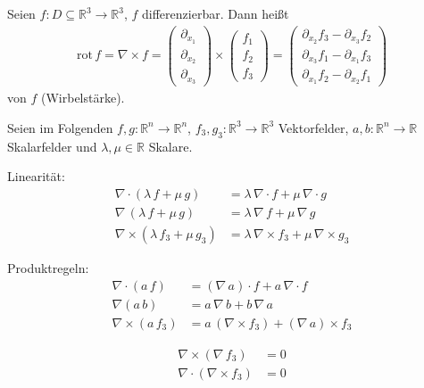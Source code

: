 \begin{theorem}[Definition]
\begin{enum-arab}
    \item Seien $f : D \subseteq \mathbb{R}^3 \to \mathbb{R}^3$, $f$ differenzierbar. Dann heißt
    \begin{align*}
      \mathrm{rot}\, f = \nabla \times f = 
      \begin{pmatrix} \partial_{x_1} \\ \partial_{x_2} \\ \partial_{x_3} \end{pmatrix}
      \times
      \begin{pmatrix} f_1 \\ f_2 \\ f_3 \end{pmatrix}
      =
      \begin{pmatrix} \partial_{x_2} f_3 - \partial_{x_3} f_2 \\ \partial_{x_3} f_1 - \partial_{x_1} f_3 \\ \partial_{x_1} f_2 - \partial_{x_2} f_1 \end{pmatrix}
    \end{align*}
     von $f$ (Wirbelstärke).
  \end{enum-arab}
\end{theorem}

\begin{notice}[Rechenregeln:]
  Seien im Folgenden $f,g : \mathbb{R}^n \to \mathbb{R}^n$, $f_3,g_3 : \mathbb{R}^3 \to \mathbb{R}^3$ Vektorfelder, $a,b : \mathbb{R}^n \to \mathbb{R}$ Skalarfelder und $\lambda, \mu \in \mathbb{R}$ Skalare.
  \begin{enum-arab}
    \item Linearität:
    \begin{align*}
      \nabla \cdot (\lambda \, f + \mu \, g) &= \lambda \, \nabla \cdot f + \mu \, \nabla \cdot g \\
      \nabla \, (\lambda \, f + \mu \, g) &= \lambda \, \nabla \, f + \mu \, \nabla \, g \\
      \nabla \times (\lambda \, f_3 + \mu \, g_3) &= \lambda \, \nabla \times f_3 + \mu \, \nabla \times g_3
    \end{align*}
    
    \item Produktregeln:
    \begin{align*}
      \nabla \cdot (a \, f) &= (\nabla \, a) \cdot f + a \, \nabla \cdot f \\
      \nabla (a \, b) &= a \, \nabla \, b + b \, \nabla \, a \\
      \nabla \times (a \, f_3) &= a \, (\nabla \times f_3) + (\nabla \, a) \times f_3
    \end{align*}
    
    \item
    \begin{align*}
      \nabla \times (\nabla \, f_3) &= 0 \\
      \nabla \cdot (\nabla \times f_3) &= 0
    \end{align*}
  \end{enum-arab}
\end{notice}

